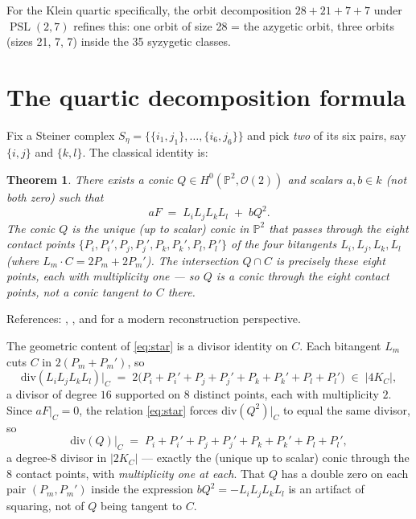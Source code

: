 \documentclass[11pt]{amsart}
\theoremstyle{plain}
\newtheorem{theorem}{Theorem}[section]
\theoremstyle{definition}
\theoremstyle{remark}
\newcommand{\PSL}{\operatorname{PSL}}
\newcommand{\Pp}{\mathbb P}
\newcommand{\Oo}{\mathcal O}
\begin{document}
For the Klein quartic specifically, the orbit decomposition $28 + 21 + 7 + 7$
under $\PSL(2,7)$ refines this: one orbit of size 28 = the azygetic orbit,
three orbits (sizes 21, 7, 7) inside the 35 syzygetic classes.

\section{The quartic decomposition formula}
\label{sec:quartic-decomp}

Fix a Steiner complex
$S_\eta = \bigl\{\{i_1,j_1\}, \ldots, \{i_6,j_6\}\bigr\}$ and pick \emph{two}
of its six pairs, say $\{i,j\}$ and $\{k,l\}$. The classical identity is:

\begin{theorem}\label{thm:quartic-decomp}
There exists a conic $Q \in H^0(\Pp^2, \Oo(2))$ and scalars $a, b \in k$
(not both zero) such that
\begin{equation}\label{eq:star}
  a F \;=\; L_i L_j L_k L_l \;+\; b Q^2.
\end{equation}
The conic $Q$ is the unique (up to scalar) conic in $\Pp^2$ that
\emph{passes through} the eight contact points
$\{P_i, P_i', P_j, P_j', P_k, P_k', P_l, P_l'\}$ of the four bitangents
$L_i, L_j, L_k, L_l$ (where $L_m \cdot C = 2 P_m + 2 P_m'$). The
intersection $Q \cap C$ is precisely these eight points, each with
multiplicity one --- so $Q$ is a conic \emph{through} the eight contact
points, not a conic tangent to $C$ there.
\end{theorem}

References: \cite[\S 220]{Salmon1879}, \cite[Prop.\ 6.1.7]{Dolgachev2012},
and \cite{CaporasoSernesi2003} for a modern reconstruction perspective.

The geometric content of \eqref{eq:star} is a divisor identity on $C$. Each
bitangent $L_m$ cuts $C$ in $2(P_m + P_m')$, so
\[
  \mathrm{div}(L_i L_j L_k L_l)\big|_C
  \;=\; 2\bigl(P_i + P_i' + P_j + P_j' + P_k + P_k' + P_l + P_l'\bigr)
  \;\in\; |4 K_C|,
\]
a divisor of degree $16$ supported on $8$ distinct points, each with
multiplicity $2$. Since $aF|_C = 0$, the relation \eqref{eq:star} forces
$\mathrm{div}(Q^2)|_C$ to equal the same divisor, so
\[
  \mathrm{div}(Q)\big|_C
  \;=\; P_i + P_i' + P_j + P_j' + P_k + P_k' + P_l + P_l',
\]
a degree-$8$ divisor in $|2 K_C|$ --- exactly the (unique up to scalar)
conic through the $8$ contact points, with \emph{multiplicity one at each}.
That $Q$ has a double zero on each pair $(P_m, P_m')$ inside the expression
$b Q^2 = -L_i L_j L_k L_l$ is an artifact of squaring, not of $Q$ being
tangent to $C$.
\end{document}
